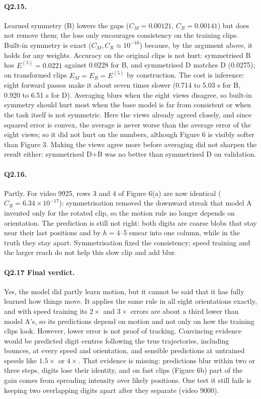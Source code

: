 \paragraph{Q2.15.} Learned symmetry (B) lowers the gaps ($C_M=0.00121$, $C_R=0.00141$) but does not remove them; the loss only encourages consistency on the training clips. Built-in symmetry is exact ($C_M,C_R\approx10^{-16}$) because, by the argument above, it holds for any weights. Accuracy on the original clips is not hurt: symmetrised B has $E^{(5)}=0.0221$ against 0.0228 for B, and symmetrised D matches D (0.0275); on transformed clips $E_M=E_R=E^{(5)}$ by construction. The cost is inference: eight forward passes make it about seven times slower (0.714 to 5.03 s for B, 0.920 to 6.51 s for D). Averaging blurs when the eight views disagree, so built-in symmetry should hurt most when the base model is far from consistent or when the task itself is not symmetric. Here the views already agreed closely, and since squared error is convex, the average is never worse than the average error of the eight views; so it did not hurt on the numbers, although Figure 6 is visibly softer than Figure 3. Making the views agree more before averaging did not sharpen the result either: symmetrised D+B was no better than symmetrised D on validation.

\paragraph{Q2.16.} Partly. For video 9925, rows 3 and 4 of Figure 6(a) are now identical ($C_R=6.34\times10^{-17}$): symmetrisation removed the downward streak that model A invented only for the rotated clip, so the motion rule no longer depends on orientation. The prediction is still not right: both digits are coarse blobs that stay near their last positions and by $h=4$--5 smear into one column, while in the truth they stay apart. Symmetrisation fixed the consistency; speed training and the larger reach do not help this slow clip and add blur.

\paragraph{Q2.17 Final verdict.} Yes, the model did partly learn motion, but it cannot be said that it has fully learned how things move. It applies the same rule in all eight orientations exactly, and with speed training its $2\times$ and $3\times$ errors are about a third lower than model A's, so its predictions depend on motion and not only on how the training clips look. However, lower error is not proof of tracking. Convincing evidence would be predicted digit centres following the true trajectories, including bounces, at every speed and orientation, and sensible predictions at untrained speeds like $1.5\times$ or $4\times$. That evidence is missing: predictions blur within two or three steps, digits lose their identity, and on fast clips (Figure 6b) part of the gain comes from spreading intensity over likely positions. One test it still fails is keeping two overlapping digits apart after they separate (video 9000).
